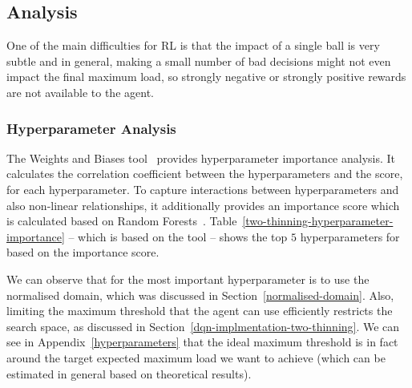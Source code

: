 \subsection{\DQL Analysis} \label{dql-analysis-two-thinning}

One of the main difficulties for RL is that the impact of a single ball is very subtle and in general, making a small number of bad decisions might not even impact the final maximum load, so strongly negative or strongly positive rewards are not available to the agent.

\subsubsection*{Hyperparameter Analysis}


The Weights and Biases tool~\cite{biewald2020wandb} provides hyperparameter importance analysis. It calculates the correlation coefficient between the hyperparameters and the score, for each hyperparameter. To capture interactions between hyperparameters and also non-linear relationships, it additionally provides an importance score which is calculated based on Random Forests~\cite{biewald2020wandb}. Table~\ref{two-thinning-hyperparameter-importance} -- which is based on the tool -- shows the top $5$ hyperparameters for \TwoThinning based on the importance score.


We can observe that for \TwoThinning the most important hyperparameter is to use the normalised domain, which was discussed in Section~\ref{normalised-domain}. Also, limiting the maximum threshold that the agent can use efficiently restricts the search space, as discussed in Section~\ref{dqn-implmentation-two-thinning}. We can see in Appendix~\ref{hyperparameters} that the ideal maximum threshold is in fact around the target expected maximum load we want to achieve (which can be estimated in general based on theoretical results).



\newcommand{\Progress}[2]{
\begin{tikzpicture}
\draw[fill=#2!10!white] (0,0) rectangle (5, 0.3);
\draw[fill=#2!50!white] (0,0) rectangle (5 * #1, 0.3);
\end{tikzpicture}
}

